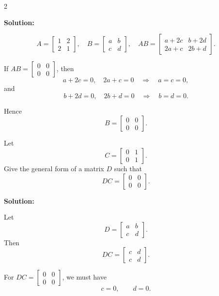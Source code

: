\documentclass[8pt]{extarticle}
\begin{document}
\begin{multicols}{2}
\begin{tcolorbox}[title=Problem 10(a) — Original Statement and Solution]
\bigskip
\noindent
\textbf{Solution:}

\[
A = \begin{bmatrix}1 & 2\\ 2 & 1\end{bmatrix},
\quad
B = \begin{bmatrix}a & b\\ c & d\end{bmatrix},
\quad
AB =
\begin{bmatrix}
a + 2c & b + 2d\\
2a + c & 2b + d
\end{bmatrix}.
\]

If \(AB = \begin{bmatrix}0 & 0\\ 0 & 0\end{bmatrix}\), then
\[
a + 2c = 0, \quad 2a + c = 0
\quad\Rightarrow\quad a = c = 0,
\]
and
\[
b + 2d = 0, \quad 2b + d = 0
\quad\Rightarrow\quad b = d = 0.
\]

Hence
\[
B = \begin{bmatrix}0 & 0\\ 0 & 0\end{bmatrix}.
\]
\end{tcolorbox}

\begin{tcolorbox}[title=Problem 10(b) — Original Statement and Solution]
\noindent
Let
\[
C =
\begin{bmatrix}
0 & 1\\
0 & 1
\end{bmatrix}.
\]
Give the general form of a matrix \(D\) such that
\[
DC =
\begin{bmatrix}
0 & 0\\
0 & 0
\end{bmatrix}.
\]

\bigskip
\noindent
\textbf{Solution:}

Let
\[
D =
\begin{bmatrix}
a & b\\
c & d
\end{bmatrix}.
\]
Then
\[
DC =
\begin{bmatrix}
c & d\\
c & d
\end{bmatrix}.
\]

For \(DC = \begin{bmatrix}0 & 0\\ 0 & 0\end{bmatrix}\), we must have
\[
c = 0, \qquad d = 0.
\]


\end{tcolorbox}
\end{multicols}
\end{document}
